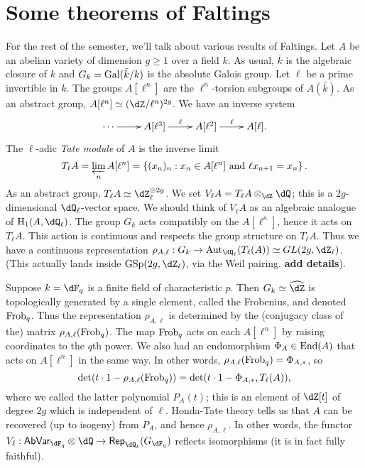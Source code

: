 




\section{Some theorems of Faltings}




For the rest of the semester, we'll talk about various results of Faltings. Let 
$A$ be an abelian variety of dimension $g\geqslant 1$ over a field $k$. As 
usual, $\bar k$ is the algebraic closure of $k$ and 
$G_k=\operatorname{Gal}(\bar k/k)$ is the absolute Galois group. Let $\ell$ be a prime 
invertible in $k$. The groups $A[\ell^n]$ are the $\ell^n$-torsion subgroups 
of $A(\bar k)$. As an abstract group, $A[\ell^n]\simeq (\dZ/\ell^n)^{2 g}$. We 
have an inverse system 
\[\xymatrix{
  \cdots \ar[r] 
    & A[\ell^3] \ar[r]^-{\ell} 
    & A[\ell^2] \ar[r]^-\ell 
    & A[\ell] \text{.}
}\]
The $\ell$-adic \emph{Tate module} of $A$ is the inverse limit 
\[
  T_\ell A = \varprojlim_n A[\ell^n] = \left\{(x_n)_n : x_n\in A[\ell^n]\text{ and }\ell x_{n+1} = x_n\right\} \text{.}
\]
As an abstract group, $T_\ell A\simeq \dZ_\ell^{\oplus 2g}$. We set 
$V_\ell A = T_\ell A\otimes_\dZ \dQ$; this is a $2g$-dimensional 
$\dQ_\ell$-vector space. We should think of $V_\ell A$ as an algebraic 
analogue of $\h_1(A,\dQ_\ell)$. The group $G_k$ acts compatibly on the 
$A[\ell^n]$, hence it acts on $T_\ell A$. This action is continuous and 
respects the group structure on $T_\ell A$. Thus we have a continuous 
representation 
$\rho_{A,\ell} : G_k \to \aut_{\dQ_\ell}(T_\ell(A))\simeq GL(2 g,\dZ_\ell)$. 
(This actually lands inside $\operatorname{GSp}(2 g,\dZ_\ell)$, via the Weil 
pairing. \textbf{add details}). 

\begin{example}
Suppose $k=\dF_q$ is a finite field of characteristic $p$. Then 
$G_k\simeq \widehat\dZ$ is topologically generated by a single element, called 
the Frobenius, and denoted $\mathrm{Frob}_q$. Thus the representation $\rho_{A,\ell}$ 
is determined by the (conjugacy class of the) matrix $\rho_{A,\ell}(\mathrm{Frob}_q)$. 
The map $\mathrm{Frob}_q$ acts on each $A[\ell^n]$ by raising coordinates to the 
$q$th power. We also had an endomorphism $\Phi_A\in \operatorname{End}(A)$ that acts on 
$A[\ell^n]$ in the same way. In other words, 
$\rho_{A,\ell}(\mathrm{Frob}_q) = \Phi_{A,\ast}$, so 
\[
  \det(t\cdot 1-\rho_{A,\ell}(\mathrm{Frob}_q)) = \det(t\cdot 1-\Phi_{A,\ast},T_\ell(A)) \text{,}
\]
where we called the latter polynomial $P_A(t)$; this is an element of 
$\dZ[t]$ of degree $2 g$ which is independent of $\ell$. Honda-Tate theory 
tells us that $A$ can be recovered (up to isogeny) from $P_A$, and hence 
$\rho_{A,\ell}$. In other words, the functor 
$V_\ell:\mathsf{AbVar}_{\dF_q}\otimes\dQ \to \mathsf{Rep}_{\dQ_\ell}(G_{\dF_q})$ 
reflects isomorphisms (it is in fact fully faithful). 
\end{example}

